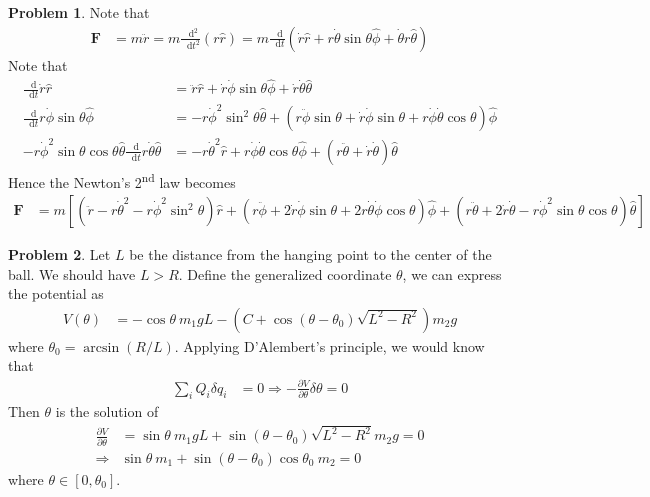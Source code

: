 \documentclass[twoside,11pt]{article}
\newcommand{\lms}{\fontfamily{lmss}\selectfont} %
\renewcommand*\d{\mathop{}\!\mathrm{d}}
\theoremstyle{definition}
\newtheorem{problem}{\lms Problem}
\theoremstyle{remark}
\begin{document}
\begin{problem}
Note that
\begin{align*}
    \mathbf{F} 
    &= m\ddot{r}
    = m\frac{\d^2}{\d t^2}(r\hat{r})
    = m\frac{\d}{\d t}(\dot{r}\hat{r} + r\dot{\theta}\sin\theta\hat{\phi} + \dot{\theta}r\hat{\theta})
\end{align*}
Note that
\begin{align*}
    \frac{\d}{\d t}\dot{r}\hat{r} 
    &= \ddot{r}\hat{r} + \dot{r}\dot{\phi}\sin\theta\hat{\phi}
    + \dot{r}\dot{\theta}\hat{\theta}\\
    \frac{\d}{\d t}r\dot{\phi}\sin\theta\hat{\phi} &= 
    -r\dot{\phi}^2\sin^2\theta\hat{\theta}
    +(r\ddot{\phi}\sin\theta + \dot{r}\dot{\phi}\sin\theta 
    + r\dot{\phi}\dot{\theta}\cos\theta)\hat{\phi}\\
    - r\dot{\phi}^2\sin\theta\cos\theta\hat{\theta}
    \frac{\d}{\d t}r\dot{\theta}\hat{\theta} &= 
    -r\dot{\theta}^2\hat{r} + r\dot{\phi}\dot{\theta}\cos\theta\hat{\phi}
    + (r\ddot{\theta} + \dot{r}\dot{\theta})\hat{\theta}
\end{align*}
Hence the Newton's 2\textsuperscript{nd} law becomes
\begin{align*}
    \mathbf{F} &= m[
    (\ddot{r} - r\dot{\theta}^2 - r\dot{\phi}^2\sin^2\theta)\hat{r}
    + (r\ddot{\phi} + 2\dot{r}\dot{\phi}\sin\theta + 2r\dot{\theta}\dot{\phi}\cos\theta)\hat{\phi}
    + (r\ddot{\theta} + 2\dot{r}\dot{\theta} - r\dot{\phi}^2\sin\theta\cos\theta)\hat{\theta}]
\end{align*}

\end{problem}


\begin{problem}
Let $L$ be the distance from the hanging point to the center of the ball.
We should have $L>R$.
Define the generalized coordinate $\theta$, we can express the potential as 
\begin{align*}
    V(\theta) &= -\cos\theta\ m_1 gL - (C+\cos(\theta-\theta_0)\sqrt{L^2-R^2})m_2g
\end{align*}
where $\theta_0=\arcsin(R/L)$.
Applying D'Alembert's principle, we would know that
\begin{align*}
    \sum_i Q_i\delta q_i &= 0 \Rightarrow
    -\frac{\partial V}{\partial \theta}\delta\theta = 0
\end{align*}
Then $\theta$ is the solution of
\begin{align*}
    \frac{\partial V}{\partial\theta} &= 
    \sin\theta~m_1 gL + \sin(\theta-\theta_0)\sqrt{L^2-R^2} m_2g = 0\\
    \Rightarrow
    &\sin\theta~m_1 + \sin(\theta-\theta_0)\cos\theta_0~m_2 = 0
\end{align*}
where $\theta\in[0, \theta_0]$.
\end{problem}
\end{document}
